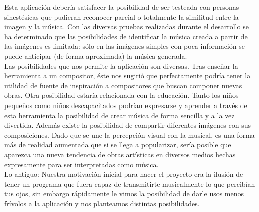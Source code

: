Esta aplicación debería satisfacer la posibilidad de ser testeada con personas sinestésicas que pudieran reconocer parcial o totalmente la similitud entre la imagen y la música. Con las diversas pruebas realizadas durante el desarrollo se ha determinado que las posibilidades de identificar la música creada a partir de las imágenes es limitada: sólo en las imágenes simples con poca información se puede anticipar (de forma aproximada) la música generada.\\

Las posibilidades que nos permite la aplicación son diversas. Tras enseñar la herramienta a un compositor, éste nos sugirió que perfectamente podría tener la utilidad de fuente de inspiración a compositores que buscan componer nuevas obras. Otra posibilidad estaría relacionada con la educación. Tanto los niños pequeños como niños descapacitados podrían expresarse y aprender a través de esta herramienta la posibilidad de crear música de forma sencilla y a la vez divertida. Además existe la posibilidad de compartir diferentes imágenes con sus composiciones.
Dado que se une la percepción visual con la musical, es una forma más de realidad aumentada que si se llega a popularizar, sería posible que aparezca una nueva tendencia de obras artísticas en diversos medios hechas expresamente para ser interpretadas como música.\\

\color{red} Lo antiguo:
Nuestra motivación inicial para hacer el proyecto era la ilusión de tener un programa que fuera capaz de transmitirte musicalmente lo que percibían tus ojos, sin embargo rápidamente le vimos la posibilidad de darle usos menos frívolos a la aplicación y nos planteamos distintas posibilidades.\\

